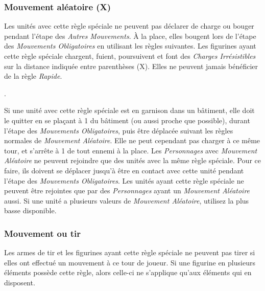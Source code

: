 \subsubsection*{Mouvement aléatoire (X)}

Les unités avec cette règle spéciale ne peuvent pas déclarer de charge ou bouger pendant l'étape des \emph{Autres Mouvements}. À la place, elles bougent lors de l'étape des \emph{Mouvements Obligatoires} en utilisant les règles suivantes. Les figurines ayant cette règle spéciale chargent, fuient, poursuivent et font des \emph{Charges Irrésistibles} sur la distance indiquée entre parenthèses (X). Elles ne peuvent jamais bénéficier de la règle \emph{Rapide}.

. 

Si une unité avec cette règle spéciale est en garnison dans un bâtiment, elle doit le quitter en se plaçant à 1{\pouce} du bâtiment (ou aussi proche que possible), durant l'étape des \emph{Mouvements Obligatoires}, puis être déplacée suivant les règles normales de \emph{Mouvement Aléatoire}. Elle ne peut cependant pas charger à ce même tour, et s'arrête à 1{\pouce} de tout ennemi à la place. Les \emph{Personnages} avec \emph{Mouvement Aléatoire} ne peuvent rejoindre que des unités avec la même règle spéciale. Pour ce faire, ils doivent se déplacer jusqu'à être en contact avec cette unité pendant l'étape des \emph{Mouvements Obligatoires}. Les unités ayant cette règle spéciale ne peuvent être rejointes que par des \emph{Personnages} ayant un \emph{Mouvement Aléatoire} aussi. Si une unité a plusieurs valeurs de \emph{Mouvement Aléatoire}, utilisez la plus basse disponible.

\subsubsection*{Mouvement ou tir}

Les armes de tir et les figurines ayant cette règle spéciale ne peuvent pas tirer si elles ont effectué un mouvement à ce tour de joueur. Si une figurine en plusieurs éléments possède cette règle, alors celle-ci ne s'applique qu'aux éléments qui en disposent.

